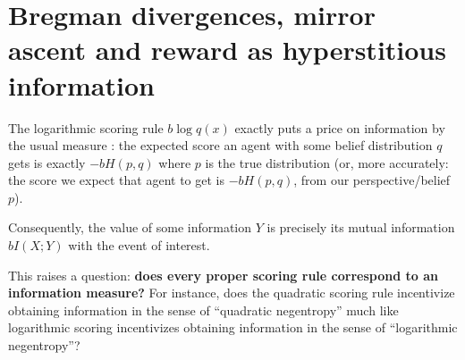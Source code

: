 \begin{notation}
\end{notation}

\section{Bregman divergences, mirror ascent and reward as hyperstitious information}
\label{agency:sec:hyperstition}

The logarithmic scoring rule $b\log q(x)$ exactly
puts a price on information by the usual measure \citep{pallavisudhirLMSRSubsidy2024}: the expected score an agent with some
belief distribution $q$ gets is exactly $-bH(p,q)$ where $p$ is the true distribution (or,
more accurately: the score we expect that agent to get is $-bH(p,q)$, from our
perspective/belief $p$).

Consequently, the value of some information $Y$ is precisely its mutual information
$bI(X;Y)$ with the event of interest.

This raises a question: \textbf{does every proper scoring rule correspond to an information
measure?} For instance, does the quadratic scoring rule incentivize obtaining information in
the sense of ``quadratic negentropy'' much like logarithmic scoring incentivizes obtaining
information in the sense of ``logarithmic negentropy''?


